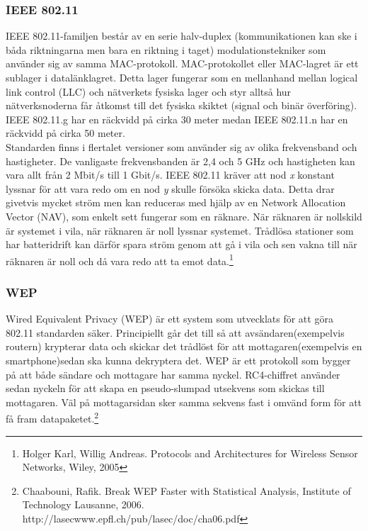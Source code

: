 \documentclass[a4paper,12pt,fleqn]{article}
\begin{document}
\subsubsection{IEEE 802.11}
IEEE 802.11-familjen består av en serie halv-duplex (kommunikationen kan ske i båda riktningarna men bara en riktning i taget) modulationstekniker som använder sig av samma MAC-protokoll. MAC-protokollet eller MAC-lagret är ett sublager i datalänklagret. Detta lager fungerar som en mellanhand mellan logical link control (LLC) och nätverkets fysiska lager och styr alltså hur nätverksnoderna får åtkomst till det fysiska skiktet (signal och binär överföring). IEEE 802.11.g har en räckvidd på cirka 30 meter medan IEEE 802.11.n har en räckvidd på cirka 50 meter.
\\
\newline
Standarden finns i flertalet versioner som använder sig av olika frekvensband och hastigheter. De vanligaste frekvensbanden är 2,4 och 5 GHz och hastigheten kan vara allt från 2 Mbit/s till 1 Gbit/s. IEEE 802.11 kräver att nod \emph{x} konstant lyssnar för att vara redo om en nod \emph{y} skulle försöka skicka data. Detta drar givetvis mycket ström men kan reduceras med hjälp av en Network Allocation Vector (NAV), som enkelt sett fungerar som en räknare. När räknaren är nollskild är systemet i vila, när räknaren är noll lyssnar systemet. Trådlösa stationer som har batteridrift kan därför spara ström genom att gå i vila och sen vakna till när räknaren är noll och då vara redo att ta emot data.\footnote{Holger Karl, Willig Andreas. Protocols and Architectures for Wireless Sensor Networks, Wiley, 2005}

\subsubsection{WEP}
Wired Equivalent Privacy (WEP) är ett system som utvecklats för att göra 802.11 standarden säker. Principiellt går det till så att avsändaren(exempelvis routern) krypterar data och skickar det trådlöst för att mottagaren(exempelvis en smartphone)sedan ska kunna dekryptera det. WEP är ett protokoll som bygger på att både sändare och mottagare har samma nyckel. RC4-chiffret använder sedan nyckeln för att skapa en pseudo-slumpad utsekvens som skickas till mottagaren. Väl på mottagarsidan sker samma sekvens fast i omvänd form för att få fram datapaketet.\footnote{\label{RC4}Chaabouni, Rafik. Break WEP Faster with Statistical Analysis, Institute of Technology Lausanne, 2006. http://lasecwww.epfl.ch/pub/lasec/doc/cha06.pdf}
\end{document}
